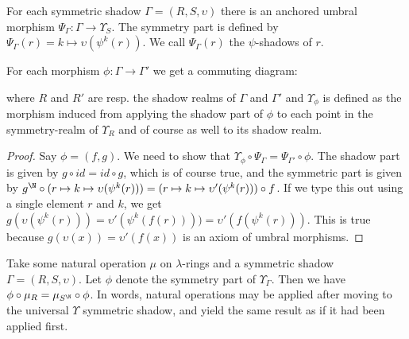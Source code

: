 \begin{propdef}
  For each symmetric shadow $\Gamma = (R, S, \upsilon)$ there is an anchored umbral morphism $\Psi_{\Gamma} : \Gamma \to \Upsilon_S$. The symmetry part is defined by $\Psi_{\Gamma}(r) = k \mapsto \upsilon(\psi^k(r))$. We call $\Psi_{\Gamma}(r)$ the $\psi$-shadows of $r$.
\end{propdef}

\begin{propdef} \label{propdef:upsilonUniversalDiagram}
  For each morphism $\phi : \Gamma \to \Gamma'$ we get a commuting diagram:
  \begin{center}
  \end{center}
  where $R$ and $R'$ are resp. the shadow realms of $\Gamma$ and $\Gamma'$ and $\Upsilon_{\phi}$ is defined as the morphism induced from applying the shadow part of $\phi$ to each point in the symmetry-realm of $\Upsilon_R$ and of course as well to its shadow realm.
\end{propdef}

\begin{proof}
  Say $\phi = (f, g)$. We need to show that $\Upsilon_{\phi} \circ \Psi_\Gamma = \Psi_{\Gamma'} \circ \phi$. The shadow part is given by $g \circ id = id \circ g$, which is of course true, and the symmetric part is given by $g^{\N} \circ (r \mapsto k \mapsto \upsilon(\psi^k(r))) = (r \mapsto k \mapsto \upsilon'(\psi^k(r))) \circ f$. If we type this out using a single element $r$ and $k$, we get $g(\upsilon(\psi^k(r))) = \upsilon'(\psi^k(f(r)))) = \upsilon'(f(\psi^k(r)))$. This is true because $g(\upsilon(x)) = \upsilon'(f(x))$ is an axiom of umbral morphisms. \qedhere
\end{proof}

\begin{proposition} \label{prop:naturalCommutativity}
  Take some natural operation $\mu$ on $\lambda$-rings and a symmetric shadow $\Gamma = (R, S, \upsilon)$. Let $\phi$ denote the symmetry part of $\Upsilon_\Gamma$. Then we have $\phi \circ \mu_R = \mu_{S^{\N}} \circ \phi$. In words, natural operations may be applied after moving to the universal $\Upsilon$ symmetric shadow, and yield the same result as if it had been applied first.
\end{proposition}

